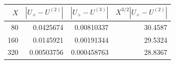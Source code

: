 \begin{tabular}{rrrr}
\toprule
$X$ & $|U_+-U^{(2)}|$ & $|U_+-U^{(3)}|$ & $X^{3/2}|U_+-U^{(2)}|$\\
\midrule
80 & 0.0425674 & 0.00810337 & 30.4587 \\
160 & 0.0145921 & 0.00191344 & 29.5324 \\
320 & 0.00503756 & 0.000458763 & 28.8367 \\
\bottomrule
\end{tabular}
